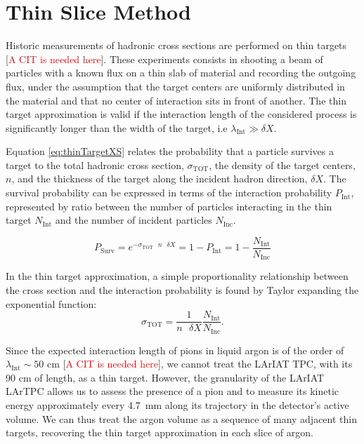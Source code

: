 \documentclass[aps,prl,twocolumn,showpacs,superscriptaddress,groupedaddress]{revtex4}  %
\begin{document}
\section{\label{sec:ThinSliceMethod}Thin Slice Method}
Historic measurements of hadronic cross sections are performed on thin targets [\textcolor{red}{A CIT is needed here}]. These experiments consists in shooting a beam of particles with a known flux on a thin slab of material and recording the outgoing flux, under the assumption that the target centers are uniformly distributed in the material and that no center of interaction sits in front of another. The thin target approximation is valid if the interaction length of the considered process is significantly longer than the width of the target, i.e $\lambda_{\text{Int}} \gg \delta X$.

Equation \ref{eq:thinTargetXS} relates the probability that a particle survives a target to the total hadronic cross section, $\sigma_{\text{TOT}}$, the density of the target centers, $n$,  and  the thickness of the target  along the incident hadron direction, $\delta X$. The survival probability can be expressed in terms of the interaction probability $P_{\text{Int}}$, represented by ratio between the number of particles interacting in the thin target $N_{\text{Int}}$ and the number of incident particles $N_{\text{Inc}}$.

\begin{equation}
P_{\text{Surv}} = e^{-\sigma_{\text{TOT}}\text{ } n \text{ }\delta X} = 1- P_{\text{Int}}  = 1 - \frac{N_{\text{Int}}}{N_{\text{Inc}}} 
\label{eq:thinTargetXS}
\end{equation}

In the thin target approximation,  a simple proportionality relationship between the cross section and the interaction probability is found by Taylor expanding the exponential function:
 \begin{equation}
 \sigma_{\text{TOT}}  = \frac{1}{n \text{ }\delta X}\frac{N_{\text{Int}}}{N_{\text{Inc}}}.
\label{eq:thinTargetXSSolved}
\end{equation}

Since the expected interaction length of pions in liquid argon is of the order of $\lambda_{\text{Int}} \sim 50$ cm [\textcolor{red}{A CIT is needed here}], we cannot treat the LArIAT TPC, with its 90 cm of length,  as a thin target. However, the granularity of the LArIAT LArTPC allows us to assess the presence of a pion and to measure its kinetic energy approximately every 4.7~mm along its trajectory in the detector's active volume. We can thus treat the argon volume as a sequence of many adjacent thin targets, recovering the thin target approximation in each slice of argon. 
\end{document}
